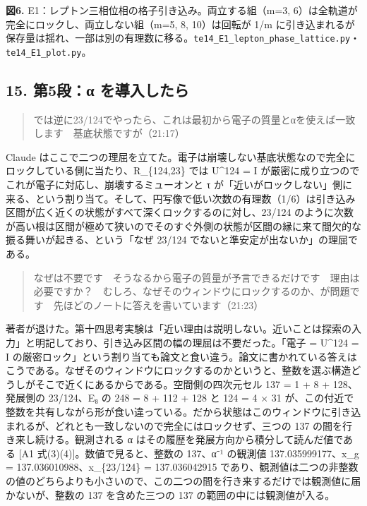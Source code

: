 \documentclass[
  a4paper,
]{ltjsarticle}
\begin{document}
\textbf{図6.} E1：レプトン三相位相の格子引き込み。両立する組（m=3,
6）は全軌道が完全にロックし、両立しない組（m=5, 8, 10）は回転が 1/m
に引き込まれるが保存量は揺れ、一部は別の有理数に移る。\texttt{te14\_\allowbreak{}E1\_\allowbreak{}lepton\_\allowbreak{}phase\_\allowbreak{}lattice.py}・\texttt{te14\_\allowbreak{}E1\_\allowbreak{}plot.py}。

\subsection{15. 第5段：α
を導入したら}\label{ux7b2c5ux6bb5ux3b1-ux3092ux5c0eux5165ux3057ux305fux3089}

\begin{quote}
では逆に23/124でやったら、これは最初から電子の質量とαを使えば一致します　基底状態ですが（21:17）
\end{quote}

Claude
はここで二つの理屈を立てた。電子は崩壊しない基底状態なので完全にロックしている側に当たり、R\_\{124,23\}
では U\^{}124 = I
が厳密に成り立つのでこれが電子に対応し、崩壊するミューオンと τ
が「近いがロックしない」側に来る、という割り当て。そして、円写像で低い次数の有理数（1/6）は引き込み区間が広く近くの状態がすべて深くロックするのに対し、23/124
のように次数が高い根は区間が極めて狭いのでそのすぐ外側の状態が区間の縁に来て間欠的な振る舞いが起きる、という「なぜ
23/124 でないと準安定が出ないか」の理屈である。

\begin{quote}
なぜは不要です　そうなるから電子の質量が予言できるだけです　理由は必要ですか？　むしろ、なぜそのウィンドウにロックするのか、が問題です　先ほどのノートに答えを書いています（21:23）
\end{quote}

著者が退けた。第十四思考実験は「近い理由は説明しない。近いことは探索の入力」と明記しており、引き込み区間の幅の理屈は不要だった。「電子
= U\^{}124 = I
の厳密ロック」という割り当ても論文と食い違う。論文に書かれている答えはこうである。なぜそのウィンドウにロックするのかというと、整数を選ぶ構造どうしがそこで近くにあるからである。空間側の四次元セル
137 = 1 + 8 + 128、発展側の 23/124、E₈ の 248 = 8 + 112 + 128 と 124 = 4
× 31
が、この付近で整数を共有しながら形が食い違っている。だから状態はこのウィンドウに引き込まれるが、どれとも一致しないので完全にはロックせず、三つの
137 の間を行き来し続ける。観測される α
はその履歴を発展方向から積分して読んだ値である {[}A1
式(3)(4){]}。数値で見ると、整数の 137、α⁻¹ の観測値 137.035999177、x\_g
= 137.036010988、x\_\{23/124\} = 137.036042915
であり、観測値は二つの非整数の値のどちらよりも小さいので、この二つの間を行き来するだけでは観測値に届かないが、整数の
137 を含めた三つの 137 の範囲の中には観測値が入る。
\end{document}
